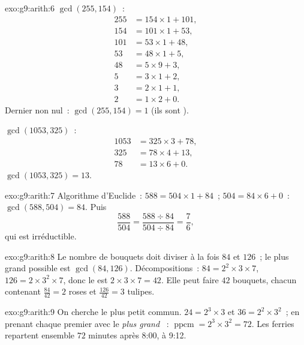 \begin{solution}{exo:g9:arith:6}
$\gcd(255, 154)$~:
\begin{align*}
255 &= 154 \times 1 + 101, \\
154 &= 101 \times 1 + 53, \\
101 &= 53 \times 1 + 48, \\
53 &= 48 \times 1 + 5, \\
48 &= 5 \times 9 + 3, \\
5 &= 3 \times 1 + 2, \\
3 &= 2 \times 1 + 1, \\
2 &= 1 \times 2 + 0 .
\end{align*}
Dernier  non nul~: $\gcd(255, 154) = 1$ (ils sont ).

$\gcd(1053, 325)$~:
\begin{align*}
1053 &= 325 \times 3 + 78, \\
325 &= 78 \times 4 + 13, \\
78 &= 13 \times 6 + 0 .
\end{align*}
$\gcd(1053, 325) = 13$.
\end{solution}

\begin{solution}{exo:g9:arith:7}
Algorithme d'Euclide~: $588 = 504 \times 1 + 84$~; $504 = 84 \times 6 +
0$~: $\gcd(588, 504) = 84$. Puis
\[
\frac{588}{504} = \frac{588 \div 84}{504 \div 84} = \frac{7}{6},
\]
qui est irréductible.
\end{solution}

\begin{solution}{exo:g9:arith:8}
Le nombre de bouquets doit diviser à la fois $84$ et $126$~; le plus
grand possible est $\gcd(84, 126)$. Décompositions~: $84 = 2^2 \times 3
\times 7$, $126 = 2 \times 3^2 \times 7$, donc le  est $2 \times 3
\times 7 = 42$. Elle peut faire $42$ bouquets, chacun contenant
$\frac{84}{42} = 2$ roses et $\frac{126}{42} = 3$ tulipes.
\end{solution}

\begin{solution}{exo:g9:arith:9}
On cherche le plus petit  commun. $24 = 2^3 \times 3$ et
$36 = 2^2 \times 3^2$~; en prenant chaque premier avec le \emph{plus
grand} ~: $\operatorname{ppcm} = 2^3 \times 3^2 = 72$. Les
ferries repartent ensemble $72$ minutes après 8:00, à 9:12.
\end{solution}

